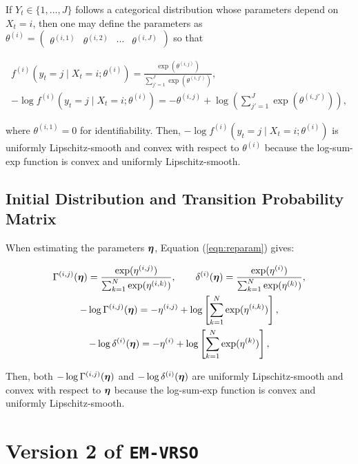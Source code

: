 If $Y_t \in \{1,\ldots,J\}$ follows a categorical distribution whose parameters depend on $X_t = i$, then one may define the parameters as $\theta^{(i)} = \begin{pmatrix} \theta^{(i,1)} & \theta^{(i,2)} & \cdots & \theta^{(i,J)} \end{pmatrix}$ so that

\begin{gather}
    f^{(i)}(y_t = j \mid X_t = i ; \theta^{(i)}) = \frac{\exp\left(\theta^{(i,j)}\right)}{\sum_{j' = 1}^{J} \exp(\theta^{(i,j')})}, \\
    - \log f^{(i)}(y_t = j \mid X_t = i ; \theta^{(i)}) = - \theta^{(i,j)} + \log \left(\sum_{j' = 1}^{J} \exp(\theta^{(i,j')})\right),
\end{gather}
    
where $\theta^{(i,1)} = 0$ for identifiability. Then, $-\log f^{(i)}(y_t = j \mid X_t = i ; \theta^{(i)})$ is uniformly Lipschitz-smooth and convex with respect to $\theta^{(i)}$ because the log-sum-exp function is convex and uniformly Lipschitz-smooth.

\subsection{Initial Distribution and Transition Probability Matrix}

When estimating the parameters $\boldsymbol{\eta}$, Equation (\ref{eqn:reparam}) gives:

\begin{gather}
    \Gamma^{(i,j)}(\boldsymbol{\eta}) = \frac{\exp(\eta^{(i,j)})}{\sum_{k=1}^N \exp(\eta^{(i,k)})}, \qquad \delta^{(i)}(\boldsymbol{\eta}) = \frac{\exp(\eta^{(i)})}{\sum_{k=1}^N \exp(\eta^{(k)})}, \\
    - \log \Gamma^{(i,j)}(\boldsymbol{\eta}) = - \eta^{(i,j)} + \log \left[\sum_{k=1}^N \exp(\eta^{(i,k)})\right], \\ 
    -\log \delta^{(i)}(\boldsymbol{\eta}) = -\eta^{(i)} + \log \left[\sum_{k=1}^N \exp(\eta^{(k)})\right],
\end{gather}

Then, both $- \log \Gamma^{(i,j)}(\boldsymbol{\eta})$ and $ - \log \delta^{(i)}(\boldsymbol{\eta})$ are uniformly Lipschitz-smooth and convex with respect to $\boldsymbol{\eta}$ because the log-sum-exp function is convex and uniformly Lipschitz-smooth.

\section{Version 2 of \texttt{EM-VRSO}}

